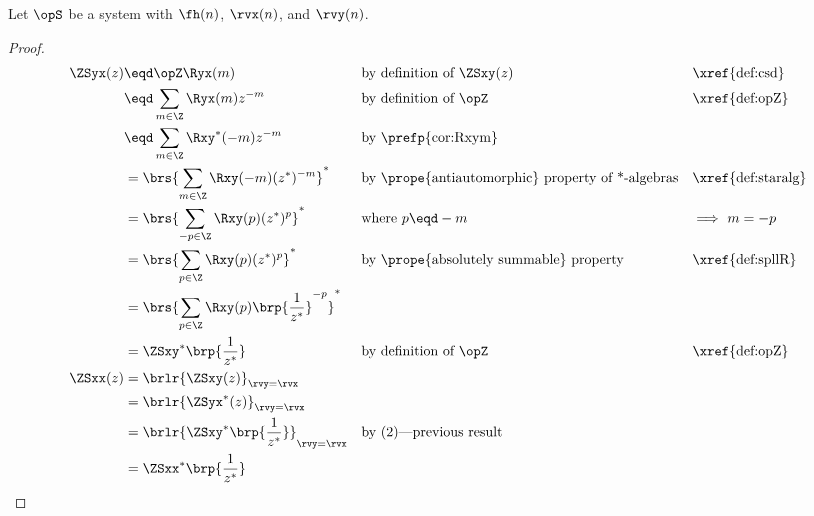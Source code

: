 \begin{theorem}
\label{thm:ZSxy_sym}
Let $\opS$ be a system with  $\fh(n)$,
 $\rvx(n)$, and  $\rvy(n)$.
\end{theorem}
\begin{proof}
\begin{align*}
  \ZSyx(z)
     &\eqd \opZ \Ryx(m)
    && \text{by definition of $\ZSxy(z)$}                          && \text{\xref{def:csd}}
  \\&\eqd \sum_{m\in\Z}\Ryx(m) z^{-m}                              
    && \text{by definition of $\opZ$}                              && \text{\xref{def:opZ}}
  \\&\eqd \sum_{m\in\Z} \Rxy^\ast(-m) z^{-m}
    && \text{by \prefp{cor:Rxym}}
  \\&= \brs{\sum_{m\in\Z} \Rxy(-m) (z^\ast)^{-m}}^\ast
    && \text{by \prope{antiautomorphic} property of *-algebras}    && \text{\xref{def:staralg}}
  \\&= \brs{\sum_{-p\in\Z} \Rxy(p) (z^\ast)^{p}}^\ast
    && \text{where $p\eqd -m$}                                     && \text{$\implies$ $m=-p$}
  \\&= \brs{\sum_{p\in\Z} \Rxy(p) (z^\ast)^{p}}^\ast
    && \text{by \prope{absolutely summable} property}              && \text{\xref{def:spllR}}
  \\&= \brs{\sum_{p\in\Z} \Rxy(p) \brp{\frac{1}{z^\ast}}^{-p}}^\ast
  \\&= \ZSxy^\ast\brp{\frac{1}{z^\ast}}
    && \text{by definition of $\opZ$}                              && \text{\xref{def:opZ}}
  \\
  \ZSxx(z)
    &= \brlr{\ZSxy(z)}_{\rvy=\rvx}
  \\&= \brlr{\ZSyx^\ast(z)}_{\rvy=\rvx}
  \\&= \brlr{\ZSxy^\ast\brp{\frac{1}{z^\ast}}}_{\rvy=\rvx}
    && \text{by (2)---previous result}
  \\&= \ZSxx^\ast\brp{\frac{1}{z^\ast}}
\end{align*}
\end{proof}

